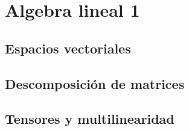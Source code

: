 \chapter{Algebra lineal 1}

\newpage
\section{Espacios vectoriales }



\newpage
\section{Descomposición de matrices}

\newpage
\section{Tensores y multilinearidad}